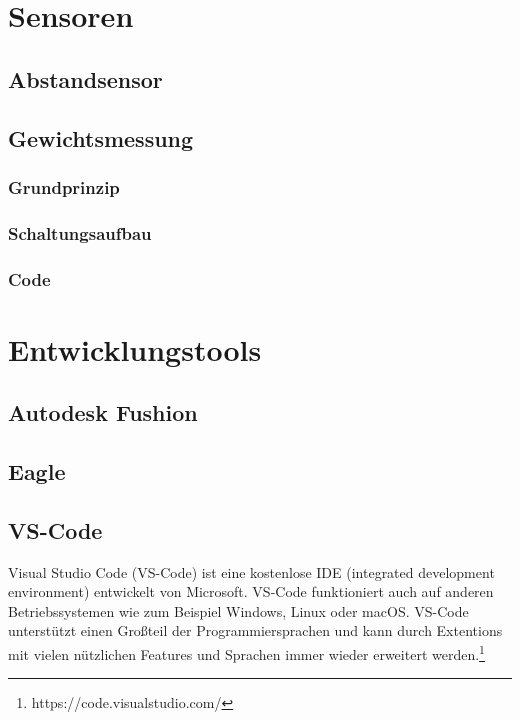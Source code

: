 \documentclass[ngerman,12pt,a4paper]{article}
\begin{document}
	\newpage
	\section{Sensoren}
	
		\subsection{Abstandsensor} %
		
		\subsection{Gewichtsmessung}
		
			\subsubsection{Grundprinzip} %
		
			\subsubsection{Schaltungsaufbau} %
		
			\subsubsection{Code} %
	
	\newpage
	\section{Entwicklungstools}
	
	 \subsection{Autodesk Fushion}
	 
	 \subsection{Eagle}
	 	 
	 \subsection{VS-Code}
	 
	 Visual Studio Code (VS-Code) ist eine kostenlose IDE (integrated development environment) entwickelt von Microsoft. VS-Code funktioniert auch auf anderen Betriebssystemen wie zum Beispiel Windows, Linux oder macOS. VS-Code unterstützt einen Großteil der Programmiersprachen und kann durch Extentions mit vielen nützlichen Features und Sprachen immer wieder erweitert werden.\footnote{https://code.visualstudio.com/}
	 	
\end{document}
